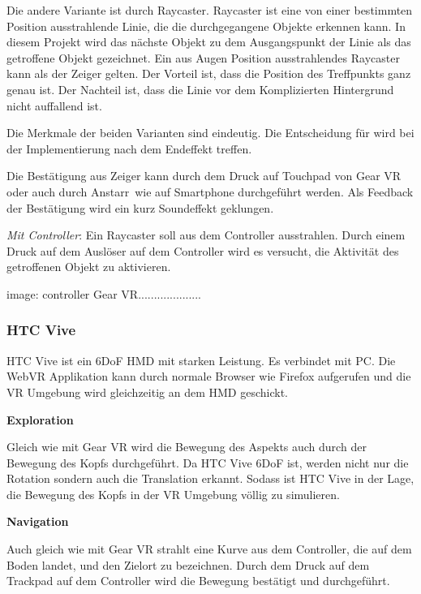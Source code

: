   Die andere Variante ist durch Raycaster. Raycaster ist eine von einer bestimmten Position ausstrahlende Linie, die die durchgegangene Objekte erkennen kann. In diesem Projekt wird das nächste Objekt zu dem Ausgangspunkt der Linie als das getroffene Objekt gezeichnet. Ein aus Augen Position ausstrahlendes Raycaster kann als der Zeiger gelten. Der Vorteil ist, dass die Position des Treffpunkts ganz genau ist. Der Nachteil ist, dass die Linie vor dem Komplizierten Hintergrund nicht auffallend ist.
  
  Die Merkmale der beiden Varianten sind eindeutig. Die Entscheidung für wird bei der Implementierung nach dem Endeffekt treffen.
  
  Die Bestätigung aus Zeiger kann durch dem Druck auf Touchpad von Gear VR oder auch durch \glqq Anstarr\grqq\ wie auf Smartphone durchgeführt werden. Als Feedback der Bestätigung wird ein kurz Soundeffekt geklungen. 
  
  \textsl{Mit Controller}: Ein Raycaster soll aus dem Controller ausstrahlen. Durch einem Druck auf dem Auslöser auf dem Controller wird es versucht, die Aktivität des getroffenen Objekt zu aktivieren. 
  
  image: controller Gear VR....................
  
 \subsubsection{HTC Vive}
 HTC Vive ist ein 6DoF HMD mit starken Leistung. Es verbindet mit PC. Die WebVR Applikation kann durch normale Browser wie Firefox aufgerufen und die VR Umgebung wird gleichzeitig an dem HMD geschickt.
 
  \textbf{Exploration}
  
  Gleich wie mit Gear VR wird die Bewegung des Aspekts auch durch der Bewegung des Kopfs durchgeführt. Da HTC Vive 6DoF ist, werden nicht nur die Rotation sondern auch die Translation  erkannt. Sodass ist HTC Vive in der Lage, die Bewegung des Kopfs in der VR Umgebung völlig zu simulieren.
  
  \textbf{Navigation}
  
  Auch gleich wie mit Gear VR strahlt eine Kurve aus dem Controller, die auf dem Boden landet, und den Zielort zu bezeichnen. Durch dem Druck auf dem Trackpad auf dem Controller wird die Bewegung bestätigt und durchgeführt.
  
